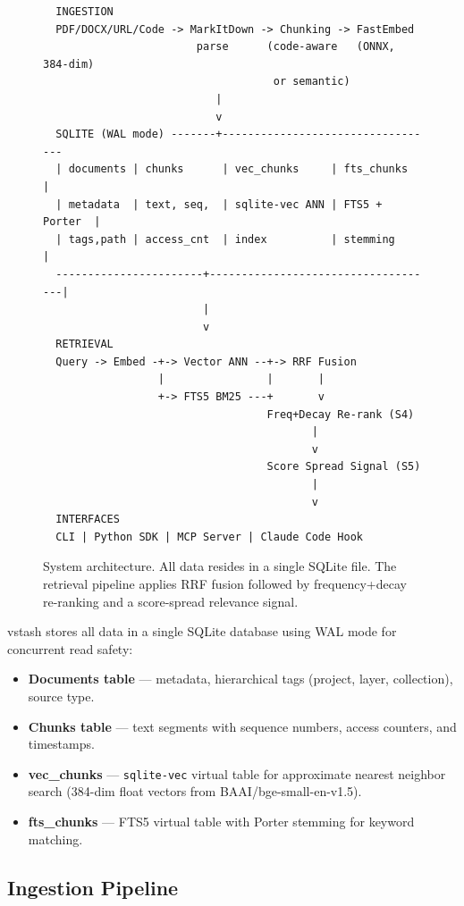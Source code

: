 \documentclass[11pt,a4paper]{article}
\begin{document}
\begin{figure}[t]
  \centering
  \small
  \begin{verbatim}
  INGESTION
  PDF/DOCX/URL/Code -> MarkItDown -> Chunking -> FastEmbed
                        parse      (code-aware   (ONNX, 384-dim)
                                    or semantic)
                           |
                           v
  SQLITE (WAL mode) -------+----------------------------------
  | documents | chunks      | vec_chunks     | fts_chunks     |
  | metadata  | text, seq,  | sqlite-vec ANN | FTS5 + Porter  |
  | tags,path | access_cnt  | index          | stemming       |
  -----------------------+------------------------------------|
                         |
                         v
  RETRIEVAL
  Query -> Embed -+-> Vector ANN --+-> RRF Fusion
                  |                |       |
                  +-> FTS5 BM25 ---+       v
                                   Freq+Decay Re-rank (S4)
                                          |
                                          v
                                   Score Spread Signal (S5)
                                          |
                                          v
  INTERFACES
  CLI | Python SDK | MCP Server | Claude Code Hook
  \end{verbatim}
  \caption{System architecture.  All data resides in a single SQLite
    file.  The retrieval pipeline applies RRF fusion followed by
    frequency+decay re-ranking and a score-spread relevance signal.}
  \label{fig:architecture}
\end{figure}

vstash stores all data in a single SQLite database using WAL mode for
concurrent read safety:

\begin{itemize}
  \item \textbf{Documents table} --- metadata, hierarchical tags
    (project, layer, collection), source type.
  \item \textbf{Chunks table} --- text segments with sequence numbers,
    access counters, and timestamps.
  \item \textbf{vec\_chunks} --- \texttt{sqlite-vec} virtual table for
    approximate nearest neighbor search (384-dim float vectors from
    BAAI/bge-small-en-v1.5).
  \item \textbf{fts\_chunks} --- FTS5 virtual table with Porter stemming
    for keyword matching.
\end{itemize}

\subsection{Ingestion Pipeline}
\end{document}

